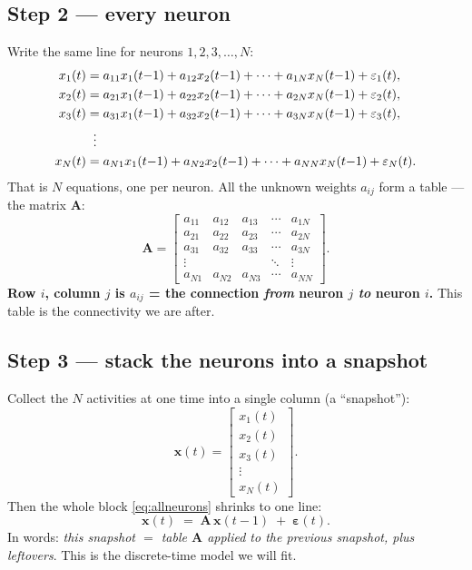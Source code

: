 \documentclass[11pt,a4paper]{article}
\newcommand{\xx}{\mathbf{x}}
\newcommand{\Amat}{\mathbf{A}}
\newcommand{\eps}{\boldsymbol{\varepsilon}}
\begin{document}
\subsection{Step 2 --- every neuron}
Write the same line for neurons $1,2,3,\dots,N$:
\begin{align}
x_1(t) &= a_{11}x_1(t{-}1) + a_{12}x_2(t{-}1) + \cdots + a_{1N}x_N(t{-}1) + \varepsilon_1(t),\notag\\
x_2(t) &= a_{21}x_1(t{-}1) + a_{22}x_2(t{-}1) + \cdots + a_{2N}x_N(t{-}1) + \varepsilon_2(t),\notag\\
x_3(t) &= a_{31}x_1(t{-}1) + a_{32}x_2(t{-}1) + \cdots + a_{3N}x_N(t{-}1) + \varepsilon_3(t),\notag\\
       &\;\;\vdots\notag\\
x_N(t) &= a_{N1}x_1(t{-}1) + a_{N2}x_2(t{-}1) + \cdots + a_{NN}x_N(t{-}1) + \varepsilon_N(t).
\label{eq:allneurons}
\end{align}
That is $N$ equations, one per neuron. All the unknown weights $a_{ij}$ form a
table --- the matrix $\Amat$:
\begin{equation}
\Amat=\begin{bmatrix}
a_{11} & a_{12} & a_{13} & \cdots & a_{1N}\\
a_{21} & a_{22} & a_{23} & \cdots & a_{2N}\\
a_{31} & a_{32} & a_{33} & \cdots & a_{3N}\\
\vdots & & & \ddots & \vdots\\
a_{N1} & a_{N2} & a_{N3} & \cdots & a_{NN}
\end{bmatrix}.
\end{equation}
\textbf{Row $i$, column $j$ is $a_{ij}$ = the connection \emph{from} neuron $j$
\emph{to} neuron $i$.} This table is the connectivity we are after.

\subsection{Step 3 --- stack the neurons into a snapshot}
Collect the $N$ activities at one time into a single column (a ``snapshot''):
\[
\xx(t)=\begin{bmatrix}x_1(t)\\ x_2(t)\\ x_3(t)\\ \vdots\\ x_N(t)\end{bmatrix}.
\]
Then the whole block \eqref{eq:allneurons} shrinks to one line:
\begin{equation}
\xx(t) \;=\; \Amat\,\xx(t{-}1) \;+\; \eps(t).
\label{eq:vector}
\end{equation}
In words: \emph{this snapshot $=$ table $\Amat$ applied to the previous snapshot,
plus leftovers}. This is the discrete-time model we will fit.
\end{document}
